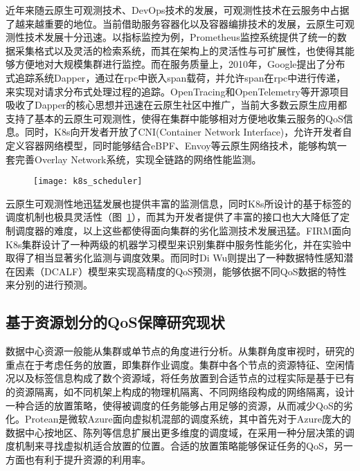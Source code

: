 近年来随云原生可观测技术、DevOps技术的发展，可观测性技术在云服务中占据了越来越重要的地位。当前借助服务容器化以及容器编排技术的发展，云原生可观测性技术发展十分迅速。以指标监控为例，Prometheus监控系统提供了统一的数据采集格式以及灵活的检索系统\citep{brazil2018prometheus}，而其在架构上的灵活性与可扩展性，也使得其能够方便地对大规模集群进行监控。而在服务质量上，2010年，Google提出了分布式追踪系统Dapper\citep{sigelman2010dapper}，通过在rpc中嵌入span载荷，并允许span在rpc中进行传递，来实现对请求分布式处理过程的追踪。OpenTracing和OpenTelemetry等开源项目吸收了Dapper的核心思想并迅速在云原生社区中推广，当前大多数云原生应用都支持了基本的云原生可观测性，使得在集群中能够相对方便地收集云服务的QoS信息。同时，K8s向开发者开放了CNI(Container Network Interface)\citep{k8s-network-plugins}，允许开发者自定义容器网络模型，同时能够结合eBPF、Envoy等云原生网络技术\citep{ebpf,envoyproxy}，能够构筑一套完善Overlay Network系统，实现全链路的网络性能监测。

\begin{figure}[!htbp]
    \centering
    \texttt{[image: k8s\_scheduler]}
    \label{fig:k8s_scheduler}
\end{figure}

云原生可观测性地迅猛发展也提供丰富的监测信息，同时K8s所设计的基于标签的调度机制也极具灵活性（图~\ref{fig:k8s_scheduler}），而其为开发者提供了丰富的接口也大大降低了定制调度器的难度，以上这些都使得面向集群的劣化监测技术发展迅猛\citep{xiang2023godel,zhang2022crisp}。FIRM\citep{qiu2020firm}面向K8s集群设计了一种两级的机器学习模型来识别集群中服务性能劣化，并在实验中取得了相当显著劣化监测与调度效果。而同时Di Wu\citep{wu2020data}则提出了一种数据特性感知潜在因素（DCALF）模型来实现高精度的QoS预测，能够依据不同QoS数据的特性来分别的进行预测。

\subsection{基于资源划分的QoS保障研究现状}


数据中心资源一般能从集群或单节点的角度进行分析。从集群角度审视时，研究的重点在于考虑任务的放置，即集群作业调度。集群中各个节点的资源特征、空闲情况以及标签信息构成了数个资源域，将任务放置到合适节点的过程实际是基于已有的资源隔离，如不同机架上构成的物理机隔离、不同网络段构成的网络隔离，设计一种合适的放置策略，使得被调度的任务能够占用足够的资源，从而减少QoS的劣化。Protean\citep{hadary2020protean}是微软Azure面向虚拟机混部的调度系统，其中首先对于Azure庞大的数据中心按地区、陈列等信息扩展出更多维度的调度域，在采用一种分层决策的调度机制来寻找虚拟机适合放置的位置。合适的放置策略能够保证任务的QoS，另一方面也有利于提升资源的利用率。

